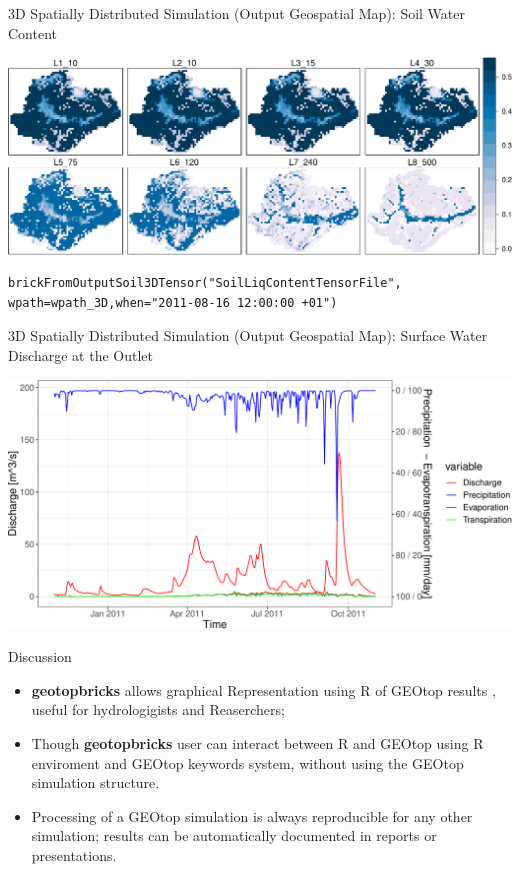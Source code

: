 \documentclass[ignorenonframetext,]{beamer}
\begin{document}
\begin{frame}[fragile]{3D Spatially Distributed Simulation (Output
Geospatial Map): Soil Water Content}

\includegraphics{presentation_files/figure-beamer/unnamed-chunk-13-1.pdf}

\begin{verbatim}
brickFromOutputSoil3DTensor("SoilLiqContentTensorFile", 
wpath=wpath_3D,when="2011-08-16 12:00:00 +01")
\end{verbatim}

\end{frame}

\begin{frame}{3D Spatially Distributed Simulation (Output Geospatial
Map): Surface Water Discharge at the Outlet}

\includegraphics{presentation_files/figure-beamer/unnamed-chunk-15-1.pdf}

\end{frame}

\begin{frame}{Discussion}

\begin{itemize}
\item
  \textbf{geotopbricks} allows graphical Representation using R of
  GEOtop results , useful for hydrologigists and Reaserchers;
\item
  Though \textbf{geotopbricks} user can interact between R and GEOtop
  using R enviroment and GEOtop keywords system, without using the
  GEOtop simulation structure.
\item
  Processing of a GEOtop simulation is always reproducible for any other
  simulation; results can be automatically documented in reports or
  presentations.
\end{itemize}

\end{frame}
\end{document}
